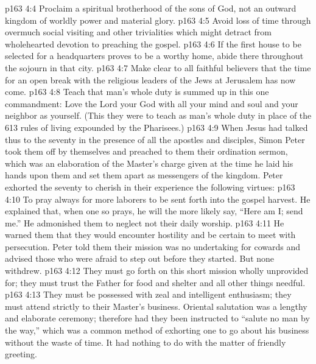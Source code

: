 \vs p163 4:4 \pc {}\bibnobreakspace Proclaim a spiritual brotherhood of the sons of God, not an outward kingdom of worldly power and material glory.
\vs p163 4:5 \pc {}\bibnobreakspace Avoid loss of time through overmuch social visiting and other trivialities which might detract from wholehearted devotion to preaching the gospel.
\vs p163 4:6 \pc {}\bibnobreakspace If the first house to be selected for a headquarters proves to be a worthy home, abide there throughout the sojourn in that city.
\vs p163 4:7 \pc {}\bibnobreakspace Make clear to all faithful believers that the time for an open break with the religious leaders of the Jews at Jerusalem has now come.
\vs p163 4:8 \pc {}\bibnobreakspace Teach that man’s whole duty is summed up in this one commandment: Love the Lord your God with all your mind and soul and your neighbor as yourself. (This they were to teach as man’s whole duty in place of the 613 rules of living expounded by the Pharisees.)
\vs p163 4:9 \pc When Jesus had talked thus to the seventy in the presence of all the apostles and disciples, Simon Peter took them off by themselves and preached to them their ordination sermon, which was an elaboration of the Master’s charge given at the time he laid his hands upon them and set them apart as messengers of the kingdom. Peter exhorted the seventy to cherish in their experience the following virtues:
\vs p163 4:10 \bibnobreakspace {} To pray always for more laborers to be sent forth into the gospel harvest. He explained that, when one so prays, he will the more likely say, “Here am I; send me.” He admonished them to neglect not their daily worship.
\vs p163 4:11 \pc {}\bibnobreakspace {} He warned them that they would encounter hostility and be certain to meet with persecution. Peter told them their mission was no undertaking for cowards and advised those who were afraid to step out before they started. But none withdrew.
\vs p163 4:12 \pc {}\bibnobreakspace {} They must go forth on this short mission wholly unprovided for; they must trust the Father for food and shelter and all other things needful.
\vs p163 4:13 \pc {}\bibnobreakspace {} They must be possessed with zeal and intelligent enthusiasm; they must attend strictly to their Master’s business. Oriental salutation was a lengthy and elaborate ceremony; therefore had they been instructed to \textcolor{ubdarkred}{“salute no man by the way,”} which was a common method of exhorting one to go about his business without the waste of time. It had nothing to do with the matter of friendly greeting.
